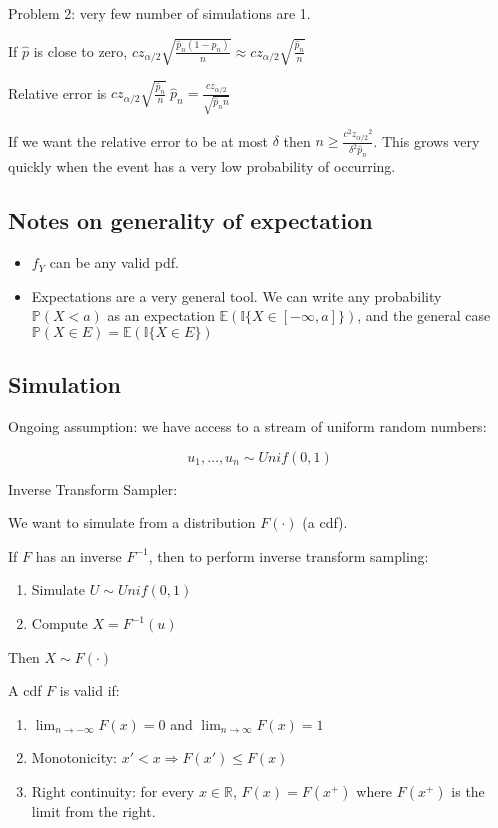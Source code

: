 \documentclass[12pt,a4paper]{article}
\theoremstyle{definition}
\begin{document}
Problem 2: very few number of simulations are 1.

If $\hat{p}$ is close to zero, $c z_{\alpha / 2} \sqrt{\frac{\hat{p}_n(1 - \hat{p}_n)}{n}} \approx c z_{\alpha / 2}\sqrt{\frac{\hat{p}_n}{n}}$

Relative error is $c z_{\alpha / 2}\sqrt{\frac{\hat{p}_n}{n}} \ \hat{p}_n = \frac{c z_{\alpha / 2}}{\sqrt{\hat{p}_n n}}$

If we want the relative error to be at most $\delta$ then $n \ge \frac{c^2 {z_{\alpha / 2}} ^ 2}{\delta ^ 2 \hat{p}_n}$. This grows very quickly when the event has a very low probability of occurring.

\subsection{Notes on generality of expectation}

\begin{itemize}
	\item $f_Y$ can be any valid pdf.
	\item Expectations are a very general tool. We can write any probability $\mathbb{P}(X < a)$ as an expectation $\mathbb{E}(\mathbb{I}\{ X \in [-\infty, a]\})$, and the general case $\mathbb{P}(X \in E) = \mathbb{E}(\mathbb{I}\{ X \in E \})$
\end{itemize}

\subsection{Simulation}

Ongoing assumption: we have access to a stream of uniform random numbers:

\[u_1, \dots, u_n \sim Unif(0, 1)\]

Inverse Transform Sampler:

We want to simulate from a distribution $F(\cdot)$ (a cdf).

If $F$ has an inverse $F^{-1}$, then to perform inverse transform sampling:

\begin{enumerate}
	\item Simulate $U \sim Unif(0, 1)$
	\item Compute $X = F^{-1} (u)$
\end{enumerate}

Then $X \sim F(\cdot)$

A cdf $F$ is valid if:

\begin{enumerate}
	\item $\lim_{n \rightarrow -\infty} F(x) = 0$ and $\lim_{n \rightarrow \infty} F(x) = 1$
	\item Monotonicity: $x' < x \Rightarrow F(x') \le F(x)$
	\item Right continuity: for every $x \in \mathbb{R}$, $F(x) = F(x^+)$ where $F(x^+)$ is the limit from the right.
\end{enumerate}
\end{document}
